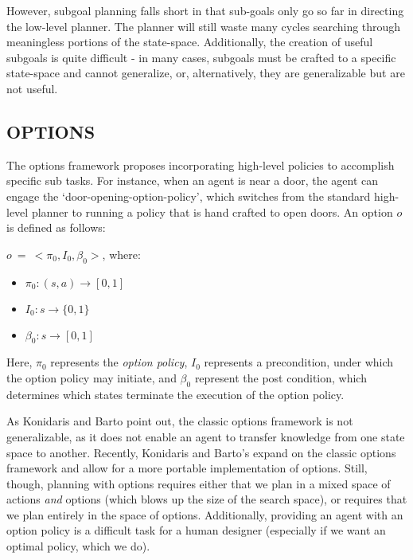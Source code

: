 \documentclass[]{article}
\newcommand{\ignore}[1]{}
\begin{document}
However, subgoal planning falls short in that sub-goals only go so far in directing the low-level planner. The planner will still waste many cycles searching through meaningless portions of the state-space. Additionally, the creation of useful subgoals is quite difficult - in many cases, subgoals must be crafted to a specific state-space and cannot generalize, or, alternatively, they are generalizable but are not useful. %



\subsection{OPTIONS}

The options framework proposes incorporating high-level policies to accomplish specific sub tasks. For instance, when an agent is near a door, the agent can engage the `door-opening-option-policy', which switches from the standard high-level planner to running a policy that is hand crafted to open doors. An option $o$ is defined as follows:

$o\ =\ <\pi_0, I_0, \beta_0>$, where:

\begin{itemize}
\item[] $\pi_0 : (s,a) \rightarrow [0,1]$
\item[] $I_0 : s \rightarrow \{0,1\}$
\item[] $\beta_0 : s \rightarrow [0,1]$
\end{itemize}

Here, $\pi_0$ represents the {\it option policy}, $I_0$ represents a precondition, under which the option policy may initiate, and $\beta_0$ represent the post condition, which determines which states terminate the execution of the option policy.

As Konidaris and Barto point out, the classic options framework is not generalizable, as it does not enable an agent to transfer knowledge from one state space to another. Recently, Konidaris and Barto's \ignore{cite} expand on the classic options framework and allow for a more portable implementation of options. Still, though, planning with options requires either that we plan in a mixed space of actions {\it and} options (which blows up the size of the search space), or requires that we plan entirely in the space of options. Additionally, providing an agent with an option policy is a difficult task for a human designer (especially if we want an optimal policy, which we do).
\end{document}

